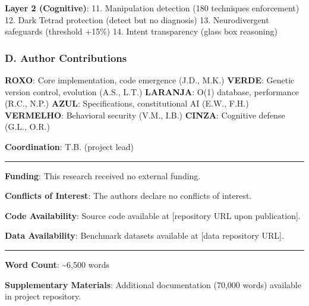 \documentclass[
]{article}
\begin{document}
\textbf{Layer 2 (Cognitive)}: 11. Manipulation detection (180 techniques
enforcement) 12. Dark Tetrad protection (detect but no diagnosis) 13.
Neurodivergent safeguards (threshold +15\%) 14. Intent transparency
(glass box reasoning)

\subsubsection{D. Author Contributions}\label{d.-author-contributions}

\textbf{ROXO}: Core implementation, code emergence (J.D., M.K.)
\textbf{VERDE}: Genetic version control, evolution (A.S., L.T.)
\textbf{LARANJA}: O(1) database, performance (R.C., N.P.) \textbf{AZUL}:
Specifications, constitutional AI (E.W., F.H.) \textbf{VERMELHO}:
Behavioral security (V.M., I.B.) \textbf{CINZA}: Cognitive defense
(G.L., O.R.)

\textbf{Coordination}: T.B. (project lead)

\begin{center}\rule{0.5\linewidth}{0.5pt}\end{center}

\textbf{Funding}: This research received no external funding.

\textbf{Conflicts of Interest}: The authors declare no conflicts of
interest.

\textbf{Code Availability}: Source code available at {[}repository URL
upon publication{]}.

\textbf{Data Availability}: Benchmark datasets available at {[}data
repository URL{]}.

\begin{center}\rule{0.5\linewidth}{0.5pt}\end{center}

\textbf{Word Count}: \textasciitilde6,500 words

\textbf{Supplementary Materials}: Additional documentation (70,000
words) available in project repository.
\end{document}
